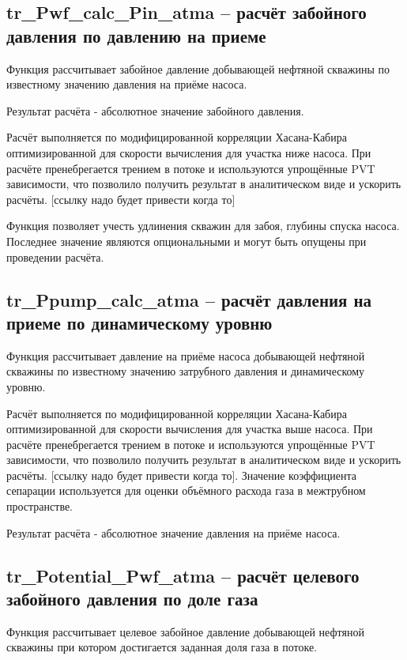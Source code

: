 \subsection{tr\_Pwf\_calc\_Pin\_atma – расчёт забойного давления по давлению на приеме}
Функция рассчитывает забойное давление добывающей нефтяной скважины по известному значению давления на приёме насоса. 

Результат расчёта - абсолютное значение забойного давления. 

Расчёт выполняется по модифицированной корреляции Хасана-Кабира оптимизированной для скорости вычисления для участка ниже насоса. При расчёте пренебрегается трением в потоке и используются упрощённые PVT зависимости, что позволило получить результат в аналитическом виде и ускорить расчёты. [ссылку надо будет привести когда то] 

Функция позволяет учесть удлинения скважин для забоя, глубины спуска насоса. Последнее значение являются опциональными и могут быть опущены при проведении расчёта. 


\subsection{tr\_Ppump\_calc\_atma – расчёт давления на приеме по динамическому уровню}
Функция рассчитывает давление на приёме насоса добывающей нефтяной скважины по известному значению затрубного давления и динамическому уровню. 

Расчёт выполняется по модифицированной корреляции Хасана-Кабира оптимизированной для скорости вычисления для участка выше насоса. При расчёте пренебрегается трением в потоке и используются упрощённые PVT зависимости, что позволило получить результат в аналитическом виде и ускорить расчёты. [ссылку надо будет привести когда то]. Значение коэффициента сепарации используется для оценки объёмного расхода газа в межтрубном пространстве. 

Результат расчёта - абсолютное значение давления на приёме насоса. 



\subsection{tr\_Potential\_Pwf\_atma – расчёт целевого забойного давления по доле газа}
Функция рассчитывает целевое забойное давление добывающей нефтяной скважины при котором достигается заданная доля газа в потоке.

